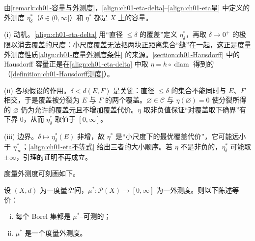 \documentclass[../../main.tex]{subfiles}%
\begin{document}
\begin{remark}\label{remark:ch01-eta是容量}
由\cref{remark:ch01-容量与外测度}，\eqref{align:ch01-eta-delta}--\eqref{align:ch01-eta星} 中定义的外测度 $\eta_\delta^*$（$\delta\in(0,\infty]$）和 $\eta^*$ 都是 $X$ 上的容量。
\end{remark}

\begin{remark}\label{remark:ch01-eta星动机}
(i) 动机。\eqref{align:ch01-eta-delta} 用“直径 $\leqslant\delta$ 的覆盖”定义 $\eta_\delta^*$，再取 $\delta\to0^+$ 的极限以消去覆盖的尺度：小尺度覆盖无法把两块正距离集合“缝”在一起，这正是度量外测度性质\eqref{align:ch01-度量外测度条件} 的来源。\cref{section:ch01-Hausdorff} 中的 Hausdorff 容量正是在\eqref{align:ch01-eta-delta} 中取 $\eta=h\circ\operatorname{diam}$ 得到的（\cref{definition:ch01-Hausdorff测度}）。

(ii) 各项假设的作用。$\delta<d(E,F)$ 是关键：直径 $\leqslant\delta$ 的集合不能同时与 $E$、$F$ 相交，于是覆盖被分裂为 $E$ 与 $F$ 的两个覆盖。$\varnothing\in\mathcal{C}$ 与 $\eta(\varnothing)=0$ 使分裂所得的 $\varnothing$ 仍为允许的覆盖元且不增加覆盖代价。$\eta$ 取非负值保证“对覆盖取下确界”有下界 $0$，从而 $\eta_\delta^*$ 取值于 $[0,\infty]$。

(iii) 边界。$\delta\mapsto\eta_\delta^*(E)$ 非增，故 $\eta^*$ 是“小尺度下的最优覆盖代价”，它可能远小于 $\eta_\infty^*$；\eqref{align:ch01-eta不等式} 给出三者的大小顺序。若 $\eta$ 不是非负的，$\eta_\delta^*$ 可能取 $\pm\infty$，引理的证明不再成立。
\end{remark}

度量外测度可刻画如下。

\begin{proposition}\label{proposition:ch01-度量外测度等价}
设 $(X,d)$ 为一度量空间，$\mu^*:\mathcal{P}(X)\to[0,\infty]$ 为一外测度。则以下陈述等价：
\begin{enumerate}[(i)]
\item 每个 Borel 集都是 $\mu^*$--可测的；
\item $\mu^*$ 是一个度量外测度。
\end{enumerate}
\end{proposition}
\end{document}
